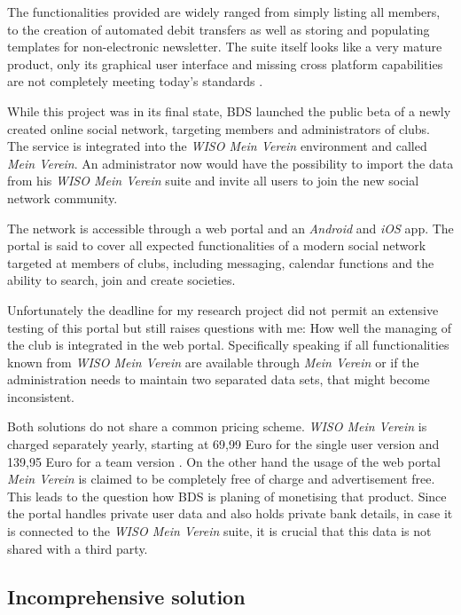 The functionalities provided are widely ranged from simply listing all members, to the creation of automated debit transfers as well as storing and populating templates for non-electronic newsletter. The suite itself looks like a very mature product, only its graphical user interface and missing cross platform capabilities are not completely meeting today's standards \cite{Buhl:2015ab}. 

While this project was in its final state, \gls{BDS} launched the public beta of a newly created online social network, targeting members and administrators of clubs. The service is integrated into the \emph{WISO Mein Verein} environment and called \emph{Mein Verein}. An administrator now would have the possibility to import the data from his \emph{WISO Mein Verein} suite and invite all users to join the new social network community. 

The network is accessible through a web portal and an \emph{Android} and \emph{iOS} app. The portal is said to cover all expected functionalities of a modern social network targeted at members of clubs, including messaging, calendar functions and the ability to search, join and create societies. 

Unfortunately the deadline for my research project did not permit an extensive testing of this portal but still raises questions with me: How well the managing of the club is integrated in the web portal. Specifically speaking if all functionalities known from \emph{WISO Mein Verein} are available through \emph{Mein Verein} or if the administration needs to maintain two separated data sets, that might become inconsistent. 

Both solutions do not share a common pricing scheme. \emph{WISO Mein Verein} is charged separately yearly, starting at 69,99 Euro for the single user version and 139,95 Euro for a team version \cite{Buhl:2015ab}. On the other hand the usage of the web portal \emph{Mein Verein} is claimed to be completely free of charge and advertisement free. This leads to the question how \gls{BDS} is planing of monetising that product. Since the portal handles private user data and also holds private bank details, in case it is connected to the \emph{WISO Mein Verein} suite, it is crucial that this data is not shared with a third party.

\subsection{Incomprehensive solution}


